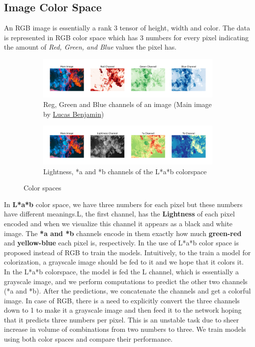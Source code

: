 \documentclass[10pt,twocolumn,letterpaper]{article}
\begin{document}
    \subsection{Image Color Space}
    \hspace*{0.167 in}An RGB image is essentially a rank 3 tensor of height, width and color. The data is represented in RGB color space which has 3 numbers for every pixel indicating the amount of \textit{Red, Green, and Blue} values the pixel has.
    \begin{figure}[!htb]
    \centering
    \begin{subfigure}[b]{0.4\textwidth}
        \centering
    	\includegraphics[width=\textwidth]{figures/rgb_colorspace}
    	\caption{Reg, Green and Blue channels of an image (Main image by \href{https://unsplash.com/@aznbokchoy}{Lucas Benjamin})}
    	\label{rgb_colorspace}
    \end{subfigure}
    \begin{subfigure}[b]{0.4\textwidth}
        \centering
    	\includegraphics[width=\textwidth]{figures/Lab_colorspace}
    	\caption{Lightness, *a and *b channels of the L*a*b colorspace}
    	\label{lab_colorspace}
    \end{subfigure}
    \caption{Color spaces}
    \end{figure}
    In \textbf{L*a*b} color space, we have three numbers for each pixel but these numbers have different meanings.L, the first channel, has the \textbf{Lightness} of each pixel encoded and when we visualize this channel it appears as a black and white image. 
    The \textbf{*a and *b} channels encode in them exactly how much \textbf{green-red} and \textbf{yellow-blue} each pixel is, respectively.
    In \cite{guadarrama2017pixcolor,isola2018imagetoimage} the use of L*a*b color space is proposed instead of RGB to train the models. Intuitively, to the train a model for colorization, a grayscale image should be fed to it and we hope that it colors it. In the L*a*b colorspace, the model is fed the L channel, which is essentially a grayscale image, and we perform computations to predict the other two channels (*a and *b). After the predictions, we concatenate the channels and get a colorful image. In case of RGB, there is a need to explicitly convert the three channels down to 1 to make it a grayscale image and then feed it to the network hoping that it predicts three numbers per pixel. This is an unstable task due to sheer increase in volume of combinations from two numbers to three. We train models using both color spaces and compare their performance.
\end{document}
